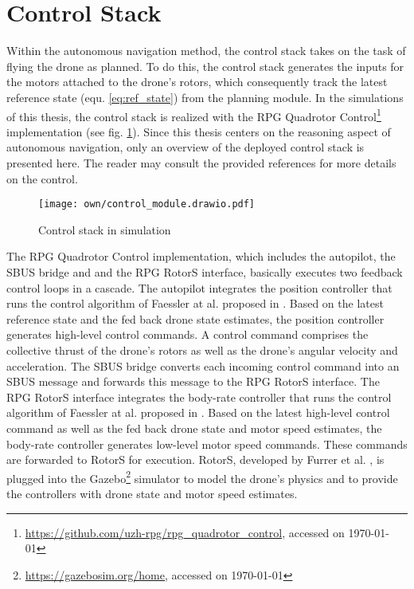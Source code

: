 \section{Control Stack} \label{sec:control_stack}
Within the autonomous navigation method, 
the control stack takes on the task of 
flying the drone as planned.
To do this, the control stack
generates the inputs for the motors attached to the drone's rotors,
which consequently track the latest reference state
(equ. \ref{eq:ref_state})
from the planning module.
In the simulations of this thesis,
the control stack is realized with the RPG Quadrotor Control\footnote{
        \url{https://github.com/uzh-rpg/rpg_quadrotor_control}, accessed on \today
} implementation
(see fig. \ref{fig:control_module}).
Since this thesis centers on the reasoning aspect of autonomous navigation, 
only an overview of the deployed control stack is presented here.
The reader may consult the provided references for more details
on the control.

\begin{figure}
    \centering
    \texttt{[image: own/control\_module.drawio.pdf]}
    \caption[
        Control stack in simulation
    ]{
        Control stack in simulation
        \label{fig:control_module}}
\end{figure}

The RPG Quadrotor Control implementation,
which includes the autopilot, the SBUS bridge and and the RPG RotorS interface,
basically executes two feedback control loops in a cascade.
The autopilot integrates the position controller 
that runs the control algorithm of Faessler at al. proposed in \cite{Faessler2018}.
Based on the latest reference state and the fed back drone state estimates,
the position controller generates high-level control commands.
A control command comprises 
the collective thrust of the drone's rotors 
as well as the drone's angular velocity and acceleration.
The SBUS bridge converts each incoming control command
into an SBUS message and forwards this message to the
RPG RotorS interface.
The RPG RotorS interface integrates the body-rate controller
that runs the control algorithm of Faessler at al. proposed in \cite{Faessler2017}.
Based on the latest high-level control command 
as well as the fed back drone state and motor speed estimates,
the body-rate controller generates low-level motor speed commands.
These commands are forwarded to RotorS for execution.
RotorS, developed by Furrer et al. \cite{Furrer2016},
is plugged into the Gazebo\footnote{
    \url{https://gazebosim.org/home}, accessed on \today
}
simulator to model the drone's physics 
and to provide the controllers with
drone state and motor speed estimates.

